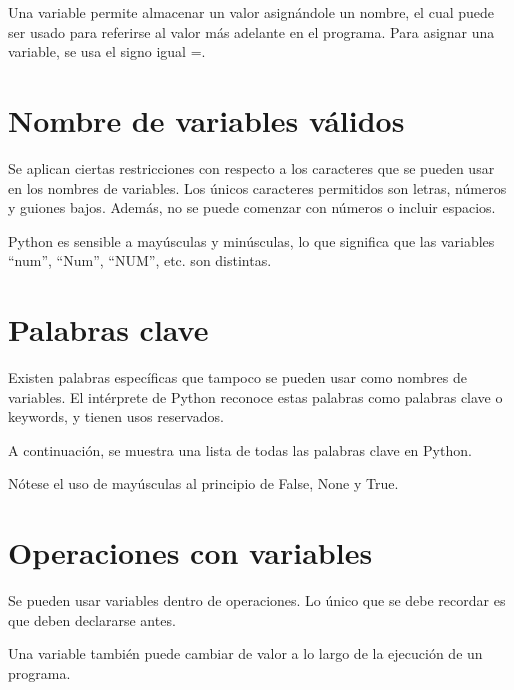 \documentclass{report}
\newcommand{\doble}[1]{``#1''}
\begin{document}
Una variable permite almacenar un valor asignándole un nombre, el cual puede ser usado para referirse al valor más adelante en el programa. Para asignar una variable, se usa el signo igual =.


\section{Nombre de variables válidos}

Se aplican ciertas restricciones con respecto a los caracteres que se pueden usar en los nombres de variables. Los únicos caracteres permitidos son letras, números y guiones bajos. Además, no se puede comenzar con números o incluir espacios.


Python es sensible a mayúsculas y minúsculas, lo que significa que las variables \doble{num}, \doble{Num}, \doble{NUM}, etc. son distintas.


\section{Palabras clave}

Existen palabras específicas que tampoco se pueden usar como nombres de variables. El intérprete de Python reconoce estas palabras como palabras clave o keywords, y tienen usos reservados.

A continuación, se muestra una lista de todas las palabras clave en Python.


Nótese el uso de mayúsculas al principio de False, None y True.

\section{Operaciones con variables}

Se pueden usar variables dentro de operaciones. Lo único que se debe recordar es que deben declararse antes.


Una variable también puede cambiar de valor a lo largo de la ejecución de un programa.

\end{document}
